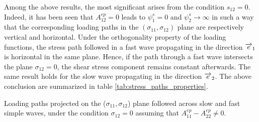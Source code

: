 Among the above results, the most significant arises from the condition $s_{12}=0$.
Indeed, it has been seen that $A_{12}^{ep}=0$ leads to $\psi_1^s=0$ and $\psi^s_2\rightarrow \infty$ in such a way that the corresponding loading paths in the $(\sigma_{11},\sigma_{12})$ plane are respectively vertical and horizontal.
Under the orthogonality property of the loading functions, the stress path followed in a fast wave propagating in the direction ${\overrightarrow{e}}_1$ is horizontal in the same plane.
Hence, if the path through a fast wave intersects the plane $\sigma_{12}=0$, the shear stress component remains constant afterwards.
The same result holds for the slow wave propagating in the direction ${\overrightarrow{e}}_2$.
The above conclusion are summarized in table \ref{tab:stress_paths_properties}.
\begin{table}[h!]
  \centering
  
  \caption{Loading paths projected on the ($\sigma_{11},\sigma_{12}$) plane followed across slow and fast simple waves, under the condition $\sigma_{12}=0$ assuming that $A_{11}^{ep}-A_{22}^{ep}\neq 0$.}
  \label{tab:stress_paths_properties}
\end{table}
